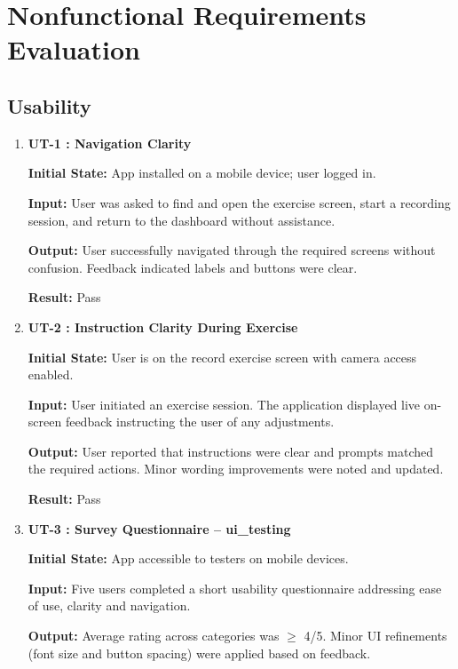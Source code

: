 \documentclass[12pt, titlepage]{article}
\begin{document}
\section{Nonfunctional Requirements Evaluation}

\subsection{Usability}

\begin{enumerate}

\item \textbf{UT-1 : Navigation Clarity}

\textbf{Initial State:} App installed on a mobile device; user logged in.

\textbf{Input:} User was asked to find and open the exercise screen, start a recording session, 
and return to the dashboard without assistance.

\textbf{Output:} User successfully navigated through the required screens without confusion. Feedback 
indicated labels and buttons were clear.

\textbf{Result:} Pass

\vspace{0.5em}

\item \textbf{UT-2 : Instruction Clarity During Exercise}

\textbf{Initial State:} User is on the record exercise screen with camera access enabled.

\textbf{Input:} User initiated an exercise session. The application displayed live on-screen feedback 
instructing the user of any adjustments.

\textbf{Output:} User reported that instructions were clear and prompts matched the required actions. 
Minor wording improvements were noted and updated.

\textbf{Result:} Pass

\vspace{0.5em}

\item \textbf{UT-3 : Survey Questionnaire -- ui\_testing}

\textbf{Initial State:} App accessible to testers on mobile devices.

\textbf{Input:} Five users completed a short usability questionnaire addressing ease of use, clarity and navigation.

\textbf{Output:} Average rating across categories was $\geq$ 4/5. Minor UI refinements (font size and button spacing) were applied based on feedback.


\end{enumerate}
\end{document}
